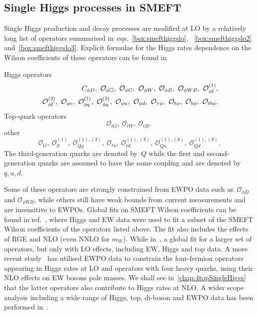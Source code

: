 \subsection{Single Higgs processes in SMEFT}
Single Higgs production and decay processes are modified at LO by a relatively long list of operators summarised in~eqs.~\eqref{box:smefthiggslo}, ~\eqref{box:smefthiggslo2} and~\eqref{box:smefthiggslo3}. Explicit formulae for the Higgs rates dependence on the Wilson coefficients of these operators can be found in~\cite{ATLAS:2019dhi}
\begin{tcolorbox}[title=SMEFT operators modifying Higgs rates at LO,
	title filled=false,
	colback=Mahogany!5!white,
	colframe=Mahogany ]
	Higgs operators
	\begin{align}
		C_{\phi D}, \ \mathcal{O}_{\phi \Box},\ \mathcal{O}_{\phi G}, \ \mathcal{O}_{\phi W},\ \mathcal{O}_{\phi B}, \ \mathcal{O}_{\phi W B},\ \mathcal{O}_{\phi l}^{(1)}, \nn \\
		\ \mathcal{O}_{\phi l}^{(3)}, \ \mathcal{O}_{\phi e},\ \mathcal{O}_{\phi q}^{(1)},\ \mathcal{O}_{\phi q}^{(3)}, \  \mathcal{O}_{\phi u}, \ \mathcal{O}_{\phi d},\ \mathcal{O}_{\tau \phi}, \ \mathcal{O}_{t \phi}, \ \mathcal{O}_{b \phi},\ \mathcal{O}_{tb \phi}.
		\label{box:smefthiggslo}
	\end{align}
	Top-quark operators
	\begin{equation}
		\mathcal{O}_{t G}, \ \mathcal{O}_{t W}, \ \mathcal{O}_{t B},
		\label{box:smefthiggslo2}
	\end{equation}
	other 
	\begin{equation}
		\mathcal{O}_G,\ \mathcal{O}_{ll}^{(1)},\ \mathcal{O}_{Qq}^{(1),(3)},\ \mathcal{O}_{tu},\ \mathcal{O}_{td}^{(1),(8)},\ \mathcal{O}_{Qu}^{(1),(8)}, \ \mathcal{O}_{Qd}^{(1),(8)}.
		\label{box:smefthiggslo3}
	\end{equation}
	The third-generation quarks are denoted by~$Q$ while the first and second-generation quarks are assumed to have the same coupling and are denoted by $q,u,d$.
\end{tcolorbox}
Some of these operators are strongly constrained from EWPO data such as~$\mathcal{O}_{\phi D}$ and $ \mathcal{O}_{\phi W B}$, while others still have weak bounds from current measurements and are insensitive to EWPOs. Global fits on SMEFT Wilson coefficients can be found in ref.~\cite{Dawson:2020oco}, where Higgs and EW data were used to fit a subset of the SMEFT Wilson coefficients of the operators listed above. The fit also includes the effects of RGE and NLO (even NNLO for $m_W$). While in~\cite{Ethier:2021bye}, a global fit for a larger set of operators, but only with LO effects, including EW, Higgs and top data.  A more recent study~\cite{Dawson:2022bxd} has utilised EWPO data to constrain the four-fermion operators appearing in Higgs rates at LO and operators with four heavy quarks, using their NLO effects on EW bosons pole masses. We shall see in~\autoref{chap:4topSingleHiggs} that the latter operators also contribute to Higgs rates at NLO. A wider scope analysis including a wide range of Higgs, top, di-boson and EWPO data has been performed in~\cite{Ellis:2020unq}. \\
